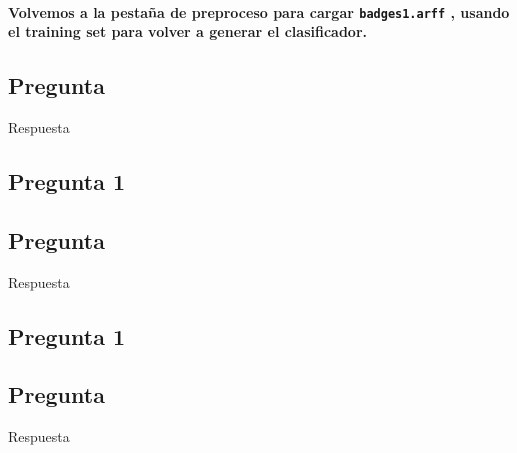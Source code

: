 \documentclass[12pt]{article}
\begin{document}
\paragraph{Volvemos a la pestaña de preproceso para cargar \texttt{badges1.arff}
, usando el training set para volver a generar el clasificador.}

\subsection{Pregunta}

Respuesta

\newpage

\begin{center}
\section{Pregunta 1}
\end{center}

\subsection{Pregunta}

Respuesta

\newpage

\begin{center}
\section{Pregunta 1}
\end{center}

\subsection{Pregunta}

Respuesta
\end{document}
